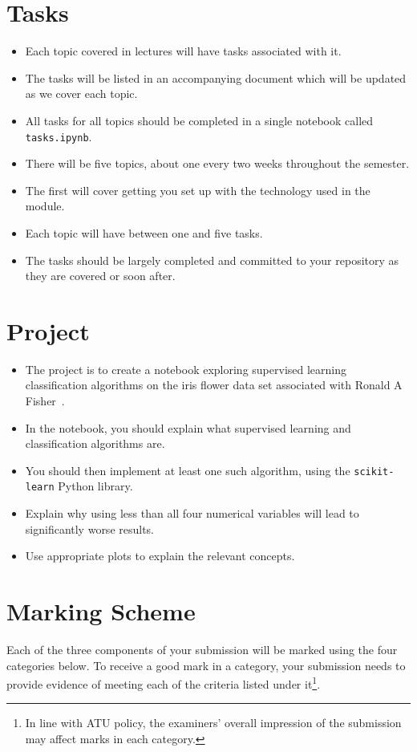 \documentclass{iansnotes}
\begin{document}
\section{Tasks}

\begin{itemize}
  \item Each topic covered in lectures will have tasks associated with it.
  \item The tasks will be listed in an accompanying document which will be updated as we cover each topic.
  \item All tasks for all topics should be completed in a single notebook called \texttt{tasks.ipynb}.
  \item There will be five topics, about one every two weeks throughout the semester.
  \item The first will cover getting you set up with the technology used in the module.
  \item Each topic will have between one and five tasks.
  \item The tasks should be largely completed and committed to your repository as they are covered or soon after.
\end{itemize} 


\section{Project}

\begin{itemize}
  \item The project is to create a notebook exploring supervised learning classification algorithms on the iris flower data set associated with Ronald A Fisher~\autocite{irisdataset}. 
  \item In the notebook, you should explain what supervised learning and classification algorithms are.
  \item You should then implement at least one such algorithm, using the \texttt{scikit-learn} Python library.
  \item Explain why using less than all four numerical variables will lead to significantly worse results.
  \item Use appropriate plots to explain the relevant concepts.
\end{itemize} 


\section{Marking Scheme}
Each of the three components of your submission will be marked using the four categories below.
To receive a good mark in a category, your submission needs to provide evidence of meeting each of the criteria listed under it\footnote{In line with ATU policy, the examiners' overall impression of the submission may affect marks in each category.}.
\end{document}
